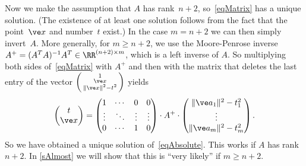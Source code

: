 \documentclass[reqno]{amsart}
\begin{document}
Now we make the assumption that $A$ has rank~$n+2$,
so~\eqref{eqMatrix} has a unique solution. (The existence of at least
one solution follows from the fact that the point~$\ve x$ and number~$t$ exist.) In the case $m = n+2$ we can then simply
invert~$A$. More generally, for $m \ge n+2$, we use
the Moore-Penrose inverse
$A^+ = (A^T A)^{-1} A^T \in \RR^{(n+2) \times m}$, which is a left
inverse of $A$. So multiplying both sides of~\eqref{eqMatrix} with
$A^+$ and then with the matrix that deletes the last entry of the
vector $\left(\begin{smallmatrix} 1 \\ \ve x \\ \lVert\ve x\rVert^2 -
    t^2\end{smallmatrix}\right)$ yields
\begin{equation} \label{eqTxA}%
  \begin{pmatrix}
    t \\
    \ve x
  \end{pmatrix} =
  \begin{pmatrix}
    1 & \cdots & 0 & 0 \\
    \vdots & \ddots & \vdots & \vdots \\
    0 & \cdots & 1 & 0
  \end{pmatrix} \cdot A^+ \cdot \begin{pmatrix}
    \lVert\ve a_1\rVert^2 - t_1^2 \\
    \vdots \\
    \lVert\ve a_m\rVert^2 - t_m^2
  \end{pmatrix}.
\end{equation}
So we have obtained a unique solution of~\eqref{eqAbsolute}. This works if
$A$ has rank~$n+2$. In \cref{sAlmost} we will show that this is ``very
likely'' if $m \ge n+2$.
\end{document}
